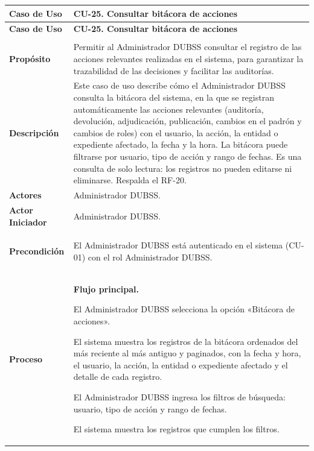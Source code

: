 \begin{longtable}{>{\raggedright\arraybackslash}p{2.9cm} >{\raggedright\arraybackslash}p{12.6cm}}
\toprule
\textbf{Caso de Uso} & \textbf{CU-25. Consultar bitácora de acciones} \\
\midrule
\endfirsthead
\toprule
\textbf{Caso de Uso} & \textbf{CU-25. Consultar bitácora de acciones} \\
\midrule
\endhead
\endfoot
\bottomrule
\multicolumn{2}{l}{\textit{Nota.} Elaboración propia.} \\
\endlastfoot
\textbf{Propósito} & Permitir al Administrador DUBSS consultar el registro de las acciones relevantes realizadas en el sistema, para garantizar la trazabilidad de las decisiones y facilitar las auditorías. \\
\midrule
\textbf{Descripción} & Este caso de uso describe cómo el Administrador DUBSS consulta la bitácora del sistema, en la que se registran automáticamente las acciones relevantes (auditoría, devolución, adjudicación, publicación, cambios en el padrón y cambios de roles) con el usuario, la acción, la entidad o expediente afectado, la fecha y la hora. La bitácora puede filtrarse por usuario, tipo de acción y rango de fechas. Es una consulta de solo lectura: los registros no pueden editarse ni eliminarse. Respalda el RF-20. \\
\midrule
\textbf{Actores} & Administrador DUBSS. \\
\midrule
\textbf{Actor Iniciador} & Administrador DUBSS. \\
\midrule
\textbf{Precondición} & \vspace{-\baselineskip}\begin{cuvin}
    \item El Administrador DUBSS está autenticado en el sistema (CU-01) con el rol Administrador DUBSS.
\end{cuvin} \\
\midrule
\textbf{Proceso} & \textbf{Flujo principal.}
\begin{cupasos}
    \item El Administrador DUBSS selecciona la opción «Bitácora de acciones».
    \item El sistema muestra los registros de la bitácora ordenados del más reciente al más antiguo y paginados, con la fecha y hora, el usuario, la acción, la entidad o expediente afectado y el detalle de cada registro.
    \item El Administrador DUBSS ingresa los filtros de búsqueda: usuario, tipo de acción y rango de fechas.
    \item El sistema muestra los registros que cumplen los filtros.

\end{cupasos}
\end{longtable}
